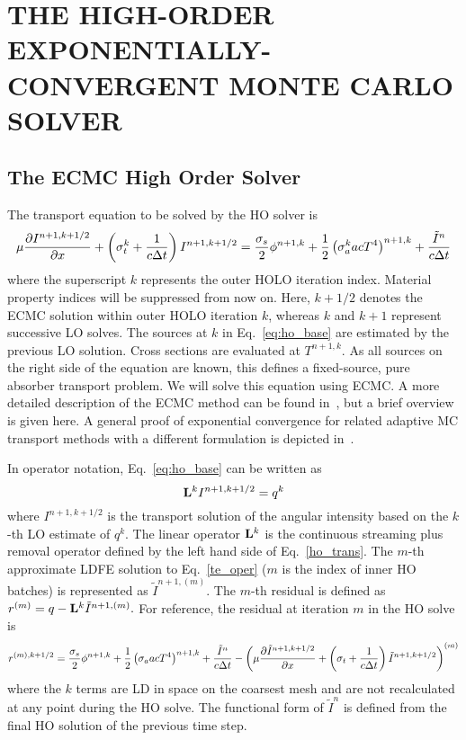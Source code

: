 
\chapter{\uppercase {The High-Order Exponentially-Convergent Monte Carlo Solver}}

\section{The ECMC High Order Solver}

The transport equation to be solved by the HO solver is
\begin{equation}\label{eq:ho_base}
\mu \frac{\partial I^{n+1,k+1/2}}{\partial x} + \left(\sigma_t^k + \frac{1}{c \Delta t }\right)
I^{n+1,k+1/2}
= \frac{\sigma_s}{2} \phi^{n+1,k} +\frac{1}{2} \left(\sigma_a^k a c T^4
\right)^{n+1,k} + \frac{\tilde I^n}{c\Delta t} 
\end{equation}
where the superscript $k$ represents the outer HOLO iteration index.  Material property indices will be
suppressed from now on.  Here, $k+1/2$ denotes the
ECMC solution within outer HOLO iteration $k$, whereas $k$ and $k+1$ represent successive LO
solves. The sources at $k$ in Eq.~\eqref{eq:ho_base} are estimated by the previous LO solution. Cross sections are
evaluated at $T^{n+1,k}$.  As all sources on the right side of the equation are known,
this defines a fixed-source, pure absorber transport problem.  We will solve
this equation using ECMC.  A more detailed description of the
ECMC method can be found in~\cite{jake}, but a brief overview is given here.  A general proof of exponential convergence for related adaptive MC transport methods with a different formulation is depicted in~\cite{spanier_mc}.

 In operator notation, Eq.~\eqref{eq:ho_base} can be written as
\begin{equation}\label{te_oper}
\mathbf{L}^k I^{n+1,k+1/2}  = q^{k}
\end{equation}
where $I^{n+1,k+1/2}$ is the transport solution of the angular intensity based on the
$k$-th LO estimate of $q^k$.
The linear operator $\mathbf{L}^k$ is the continuous streaming plus
removal operator defined by the left hand
side of Eq.~\eqref{ho_trans}.
The $m$-th approximate LDFE solution to Eq.~\eqref{te_oper} ($m$ is the index of inner HO
batches) is represented as
$\tilde{I}^{n+1,(m)}$.    
The $m$-th residual is defined as $r^{(m)} = q - \mathbf{L}^k\tilde{I}^{n+1,(m)}.$ 
For reference, the residual at iteration $m$ in the HO solve
is
\begin{equation}\label{eq:resid}
r^{(m),k+1/2} = \frac{\sigma_s}{2} \phi^{n+1,k} +\frac{1}{2} \left(\sigma_a a c T^4
\right)^{n+1,k} + \frac{\tilde{I}^n}{c \Delta t } -
\left(\mu \frac{\partial \tilde{I}^{n+1,k+1/2}}{\partial x} +
\left(\sigma_t + \frac{1}{c \Delta t }\right) \tilde{I}^{n+1,k+1/2}\right)^{(m)}
\end{equation}
where the $k$ terms are LD in space on the coarsest mesh and are not recalculated at any point during
the HO solve. The functional form of $\tilde{I}^n$ is defined from the final HO
solution of the previous time step.  

